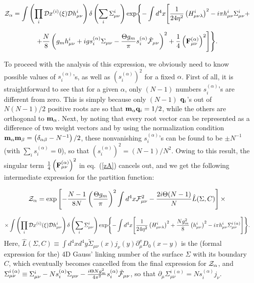 \documentclass[a4paper,12pt]{article}
\begin{document}
$$
{\cal Z}_\alpha=\int\left(\prod\limits_{i}^{}{\cal D}x^{(i)}(\xi){\cal D}h_{\mu\nu}^i\right)
\delta\left(\sum\limits_{i}^{}\Sigma_{\mu\nu}^i\right)
\exp\Biggl\{-\int d^4x\Biggl[\frac{1}{24\eta^2}
\left(H_{\mu\nu\lambda}^i\right)^2-i\pi h_{\mu\nu}^i\Sigma_{\mu\nu}^i+$$

\begin{equation}
\label{zA}
+\frac{N}{8}\left(
g_mh_{\mu\nu}^i+igs_i^{(\alpha)}
\Sigma_{\mu\nu}-\frac{\Theta g_m}{\pi} s_i^{(\alpha)}
\tilde{\cal F}_{\mu\nu}\right)^2
+\frac14\left({\bf F}_{\mu\nu}^{(\alpha)}
\right)^2\Biggr]\Biggr\}.
\end{equation}

To proceed with the analysis of this expression, we obviously need to know possible values of $s_i^{(\alpha)}$'s,
as well as $\left(s_i^{(\alpha)}\right)^2$ for a fixed $\alpha$. First of all,
it is straightforward to see that
for a given $\alpha$, only $(N-1)$ numbers $s_i^{(\alpha)}$'s are different from zero.
This is simply because
only $(N-1)$ ${\bf q}_i$'s out of $N(N-1)/2$ positive roots are so that ${\bf m}_\alpha{\bf q}_i=1/2$,
while the others are orthogonal to ${\bf m}_\alpha$.
Next, by noting that every root vector can be represented as a difference of two weight vectors and by using the
normalization condition ${\bf m}_\alpha{\bf m}_\beta=\left(\delta_{\alpha\beta}-N^{-1}\right)/2$, these nonvanishing $s_i^{(\alpha)}$'s can be found
to be $\pm N^{-1}$ (with $\sum\limits_{i}^{}s_i^{(\alpha)}=0$),
so that $\left(s_i^{(\alpha)}\right)^2=(N-1)/N^2$. Owing to this result, the singular term
$\frac14\left({\bf F}_{\mu\nu}^{(\alpha)}\right)^2$ in eq.~(\ref{zA}) cancels out, and we get the following intermediate expression
for the partition function:

$$
{\cal Z}_\alpha=\exp\left[-\frac{N-1}{8N}\left(\frac{\Theta g_m}{\pi}\right)^2\int d^4x
{\cal F}_{\mu\nu}^2
-\frac{2i\Theta(N-1)}{N}\hat L(\Sigma, C)\right]\times$$

\begin{equation}
\label{result}
\times\int\left(\prod\limits_{i}^{}{\cal D}x^{(i)}(\xi){\cal D}h_{\mu\nu}^i\right)
\delta\left(\sum\limits_{i}^{}\Sigma_{\mu\nu}^i\right)\exp\Biggl\{-\int d^4x\Biggl[\frac{1}{24\eta^2}
\left(H_{\mu\nu\lambda}^i\right)^2+\frac{Ng_m^2}{8}\left(h_{\mu\nu}^i\right)^2
-i\pi h_{\mu\nu}^i\Sigma_{\mu\nu}^{i{\,}(\alpha)}\Biggr]\Biggr\}.
\end{equation}
Here, $\hat L(\Sigma, C)\equiv\int d^4xd^4y\tilde\Sigma_{\mu\nu}(x)j_\nu(y)\partial_\mu^xD_0(x-y)$
is the (formal expression for the) 4D Gauss' linking number
of the surface $\Sigma$ with its boundary $C$, which eventually
becomes cancelled from the
final expression for ${\cal Z}_\alpha$, and
$\Sigma_{\mu\nu}^{i{\,}(\alpha)}\equiv\Sigma_{\mu\nu}^i-
Ns_i^{(\alpha)}\Sigma_{\mu\nu}-
\frac{i\Theta Ng_m^2}{4\pi^2}s_i^{(\alpha)}\tilde{\cal F}_{\mu\nu}$, so that
$\partial_\mu\Sigma_{\mu\nu}^{i{\,}(\alpha)}=Ns_i^{(\alpha)}j_\nu$.
\end{document}
